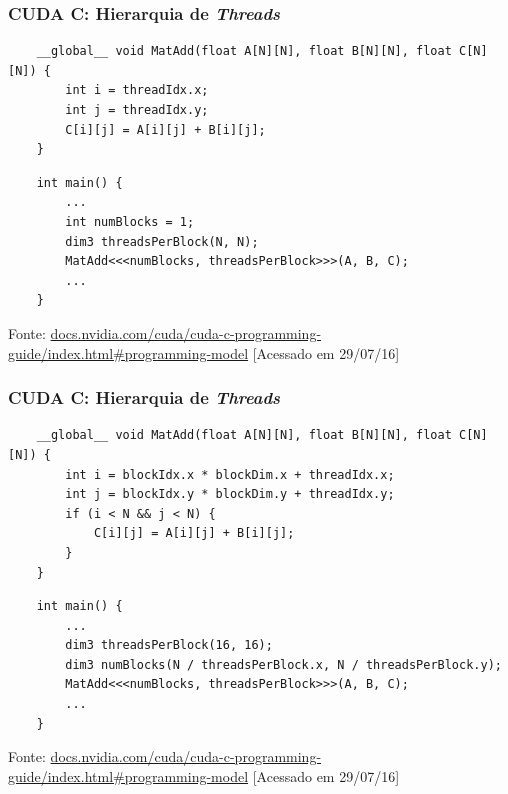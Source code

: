 \documentclass[10pt, compress]{beamer}
\begin{document}
\begin{frame}[fragile]
    \frametitle{CUDA C: Hierarquia de \textit{Threads}}
    \begin{lstlisting}
    __global__ void MatAdd(float A[N][N], float B[N][N], float C[N][N]) {
        int i = threadIdx.x;
        int j = threadIdx.y;
        C[i][j] = A[i][j] + B[i][j];
    }
    \end{lstlisting}
    \pause
    \begin{lstlisting}
    int main() {
        ...
        int numBlocks = 1;
        dim3 threadsPerBlock(N, N);
        MatAdd<<<numBlocks, threadsPerBlock>>>(A, B, C);
        ...
    }
    \end{lstlisting}
    \vfill

    \begin{center}
        \tiny{Fonte: \url{docs.nvidia.com/cuda/cuda-c-programming-guide/index.html\#programming-model} [Acessado em 29/07/16]}
    \end{center}
\end{frame}

\begin{frame}[fragile]
    \frametitle{CUDA C: Hierarquia de \textit{Threads}}
    \begin{lstlisting}
    __global__ void MatAdd(float A[N][N], float B[N][N], float C[N][N]) {
        int i = blockIdx.x * blockDim.x + threadIdx.x;
        int j = blockIdx.y * blockDim.y + threadIdx.y;
        if (i < N && j < N) {
            C[i][j] = A[i][j] + B[i][j];
        }
    }
    \end{lstlisting}
    \pause
    \begin{lstlisting}
    int main() {
        ...
        dim3 threadsPerBlock(16, 16);
        dim3 numBlocks(N / threadsPerBlock.x, N / threadsPerBlock.y);
        MatAdd<<<numBlocks, threadsPerBlock>>>(A, B, C);
        ...
    }
    \end{lstlisting}
    \vfill

    \begin{center}
        \tiny{Fonte: \url{docs.nvidia.com/cuda/cuda-c-programming-guide/index.html\#programming-model} [Acessado em 29/07/16]}
    \end{center}
\end{frame}
\end{document}
